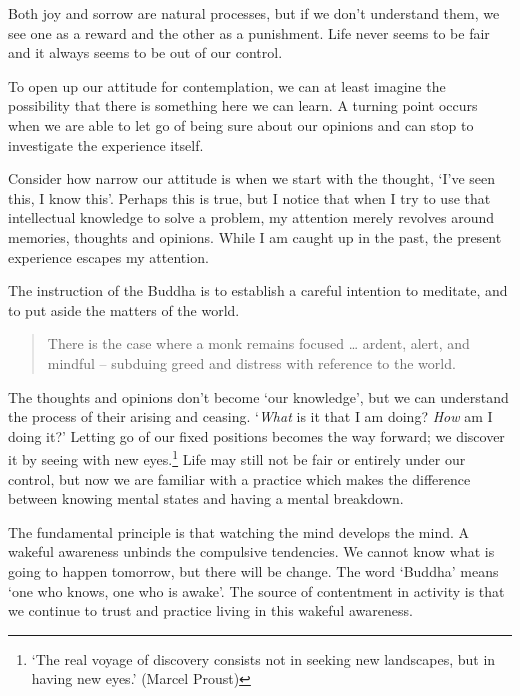 Both joy and sorrow are natural processes, but if we don't understand
them, we see one as a reward and the other as a punishment. Life never
seems to be fair and it always seems to be out of our control.

To open up our attitude for contemplation, we can at least imagine the
possibility that there is something here we can learn. A turning point
occurs when we are able to let go of being sure about our opinions and
can stop to investigate the experience itself.

Consider how narrow our attitude is when we start with the thought,
`I've seen this, I know this'. Perhaps this is true, but I notice that
when I try to use that intellectual knowledge to solve a problem, my
attention merely revolves around memories, thoughts and opinions. While
I am caught up in the past, the present experience escapes my attention.

The instruction of the Buddha is to establish a careful intention to
meditate, and to put aside the matters of the world.

\clearpage

\begin{quote}
There is the case where a monk remains focused \ldots{} ardent, alert,
and mindful -- subduing greed and distress with reference to the world.

\bigskip

\end{quote}

The thoughts and opinions don't become `our knowledge', but we can
understand the process of their arising and ceasing. `\emph{What} is it
that I am doing? \emph{How} am I doing it?' Letting go of our fixed
positions becomes the way forward; we discover it by seeing with new
eyes.\footnote{`The real voyage of discovery consists not in seeking new
  landscapes, but in having new eyes.' (Marcel Proust)} Life may still
not be fair or entirely under our control, but now we are familiar with
a practice which makes the difference between knowing mental states and
having a mental breakdown.

The fundamental principle is that watching the mind develops the mind. A
wakeful awareness unbinds the compulsive tendencies. We cannot know what
is going to happen tomorrow, but there will be change. The word `Buddha'
means `one who knows, one who is awake'. The source of contentment in
activity is that we continue to trust and practice living in this
wakeful awareness.
